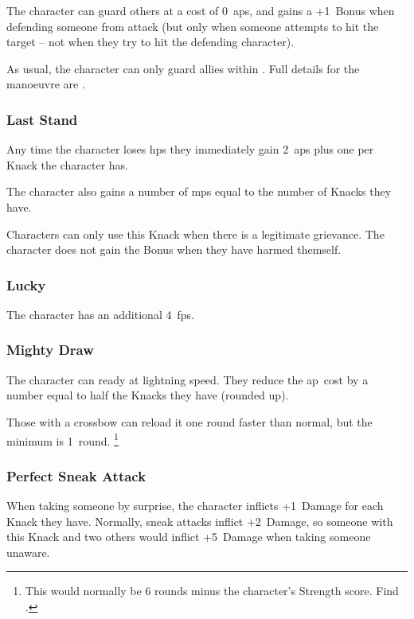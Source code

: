\begin{multicols}{2}
The character can guard others at a cost of 0~\glspl{ap}, and gains a +1~Bonus when defending someone from attack (but only when someone attempts to hit the target -- not when they try to hit the defending character).

As usual, the character can only guard allies within .
Full details for the manoeuvre are .

\subsubsection{Last Stand}

Any time the character loses \glspl{hp} they immediately gain 2~\glspl{ap} plus one per Knack the character has.

The character also gains a number of \glspl{mp} equal to the number of Knacks they have.

Characters can only use this Knack when there is a legitimate grievance.
The character does not gain the Bonus when they have harmed themself.

\subsubsection{Lucky}

The character has an additional 4~\glspl{fp}.

\subsubsection{Mighty Draw}

The character can ready  at lightning speed.
They reduce the \gls{ap}~cost by a number equal to half the Knacks they have (rounded up).

Those with a crossbow can reload it one round faster than normal, but the minimum is 1~round.%
\footnote{This would normally be 6 rounds minus the character's Strength score.
Find  .}

\subsubsection{Perfect Sneak Attack}

When taking someone by surprise, the character inflicts +1~Damage for each Knack they have.
Normally, sneak attacks inflict +2~Damage, so someone with this Knack and two others would inflict +5~Damage when taking someone unaware.


\end{multicols}
